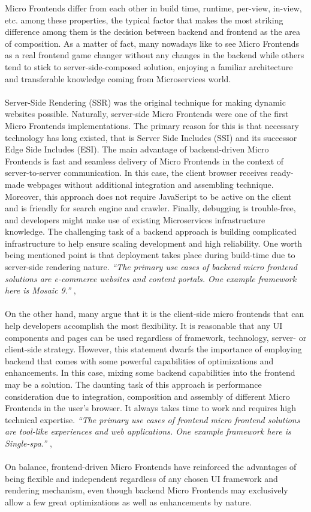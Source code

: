\documentclass[a4paper]{book}
\begin{document}
Micro Frontends differ from each other in build time, runtime, per-view, in-view, etc. among these properties, the typical factor that makes the most striking difference among them is the decision between backend and frontend as the area of composition. As a matter of fact, many nowadays like to see Micro Frontends as a real frontend game changer without any changes in the backend while others tend to stick to server-side-composed solution, enjoying a familiar architecture and transferable knowledge coming from Microservices world. 
\\ 
\\
Server-Side Rendering (SSR) was the original technique for making dynamic websites possible. Naturally, server-side Micro Frontends were one of the first Micro Frontends implementations. The primary reason for this is that necessary technology has long existed, that is Server Side Includes (SSI) and its successor Edge Side Includes (ESI). The main advantage of backend-driven Micro Frontends is fast and seamless delivery of Micro Frontends in the context of server-to-server communication. In this case, the client browser receives ready-made webpages without additional integration and assembling technique. Moreover, this approach does not require JavaScript to be active on the client and is friendly for search engine and crawler. Finally, debugging is trouble-free, and developers might make use of existing Microservices infrastructure knowledge. The challenging task of a backend approach is building complicated infrastructure to help ensure scaling development and high reliability. One worth being mentioned point is that deployment takes place during build-time due to server-side rendering nature. \textit{“The primary use cases of backend micro frontend solutions are e-commerce websites and content portals. One example framework here is Mosaic 9.”} \cite{Rap20}, \cite{Zalando}
\\ 
\\
On the other hand, many argue that it is the client-side micro frontends that can help developers accomplish the most flexibility. It is reasonable that any UI components and pages can be used regardless of framework, technology, server- or client-side strategy. However, this statement dwarfs the importance of employing backend that comes with some powerful capabilities of optimizations and enhancements. In this case, mixing some backend capabilities into the frontend may be a solution. The daunting task of this approach is performance consideration due to integration, composition and assembly of different Micro Frontends in the user’s browser. It always takes time to work and requires high technical expertise. \textit{“The primary use cases of frontend micro frontend solutions are tool-like experiences and web applications. One example framework here is Single-spa.”} \cite{Rap20}, \cite{SingleSPA}
\\ 
\\
On balance, frontend-driven Micro Frontends have reinforced the advantages of being flexible and independent regardless of any chosen UI framework and rendering mechanism, even though backend Micro Frontends may exclusively allow a few great optimizations as well as enhancements by nature.
\end{document}
